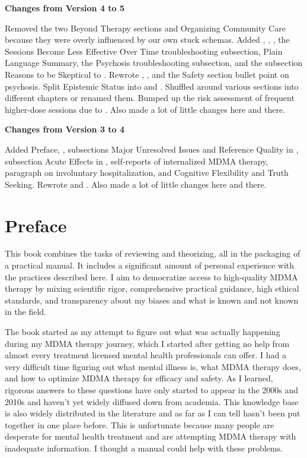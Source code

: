 \documentclass[11pt,oneside]{book}
\newcommand{\frontsection}[1]{%
  \par\vspace{2\baselineskip}%
  {\centering\sffamily\bfseries\large #1\par}%
  \nopagebreak\vspace{\baselineskip}%
}
\begin{document}
\frontsection{Changes from Version 4 to 5}
Removed the two Beyond Therapy sections and Organizing Community Care because they were overly influenced by our own stuck schemas. Added , , , the Sessions Become Less Effective Over Time troubleshooting subsection, Plain Language Summary, the Psychosis troubleshooting subsection, and the subsection Reasons to be Skeptical to . Rewrote , , and the Safety section bullet point on psychosis. Split Epistemic Status into  and . Shuffled around various sections into different chapters or renamed them. Bumped up the risk assessment of frequent higher-dose sessions due to \textcite{corayMemory}. Also made a lot of little changes here and there.

\frontsection{Changes from Version 3 to 4}
Added Preface, , subsections Major Unresolved Issues and Reference Quality in , subsection Acute Effects in , self-reports of internalized MDMA therapy, paragraph on involuntary hospitalization, and Cognitive Flexibility and Truth Seeking. Rewrote  and . Also made a lot of little changes here and there.

\clearpage

\tableofcontents

\chapter*{Preface}
\label{preface}
This book combines the tasks of reviewing and theorizing, all in the packaging of a practical manual. It includes a significant amount of personal experience with the practices described here. I aim to democratize access to high-quality MDMA therapy by mixing scientific rigor, comprehensive practical guidance, high ethical standards, and transparency about my biases and what is known and not known in the field.

The book started as my attempt to figure out what was actually happening during my MDMA therapy journey, which I started after getting no help from almost every treatment licensed mental health professionals can offer. I had a very difficult time figuring out what mental illness is, what MDMA therapy does, and how to optimize MDMA therapy for efficacy and safety. As I learned, rigorous answers to these questions have only started to appear in the 2000s and 2010s and haven't yet widely diffused down from academia. This knowledge base is also widely distributed in the literature and as far as I can tell hasn't been put together in one place before. This is unfortunate because many people are desperate for mental health treatment and are attempting MDMA therapy with inadequate information. I thought a manual could help with these problems.
\end{document}
